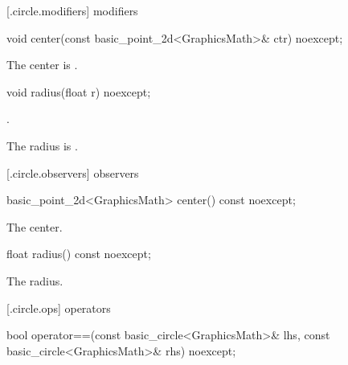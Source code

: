  [\iotwod.circle.modifiers]{ modifiers}

%
\begin{itemdecl}
void center(const basic_point_2d<GraphicsMath>& ctr) noexcept;
\end{itemdecl}

\begin{itemdescr}
\pnum
\effects
The center is .
\end{itemdescr}

%
\begin{itemdecl}
void radius(float r) noexcept;
\end{itemdecl}
\begin{itemdescr}
\requires
{}.

\pnum
\effects
The radius is .
\end{itemdescr}

 [\iotwod.circle.observers]{ observers}

%
\begin{itemdecl}
basic_point_2d<GraphicsMath> center() const noexcept;
\end{itemdecl}
\begin{itemdescr}
\pnum
\returns
The center.
\end{itemdescr}

%
\begin{itemdecl}
float radius() const noexcept;
\end{itemdecl}
\begin{itemdescr}
\pnum
\returns
The radius.
\end{itemdescr}

 [\iotwod.circle.ops] { operators}

%
\begin{itemdecl}
bool operator==(const basic_circle<GraphicsMath>& lhs,
  const basic_circle<GraphicsMath>& rhs) noexcept;
\end{itemdecl}
\begin{itemdescr}
\pnum
\returns
{}
\end{itemdescr}
